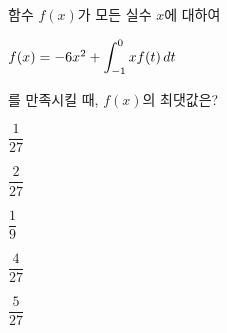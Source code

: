 함수 $f(x)$가 모든 실수 $x$에 대하여 \par\smallskip\noindent\hspace*{1.5em}$f(x)=-6x^2+\displaystyle\int_{-1}^{0}xf(t)\mkern3mu dt$\par\smallskip\noindent 를 만족시킬 때, $f(x)$의 최댓값은?
\begin{choices32}{\rule[-3ex]{0pt}{8ex}$\dfrac{1}{27}$}{\rule[-3ex]{0pt}{8ex}$\dfrac{2}{27}$}{\rule[-3ex]{0pt}{8ex}$\dfrac{1}{9}$}{\rule[-3ex]{0pt}{8ex}$\dfrac{4}{27}$}{\rule[-3ex]{0pt}{8ex}$\dfrac{5}{27}$}\end{choices32}
